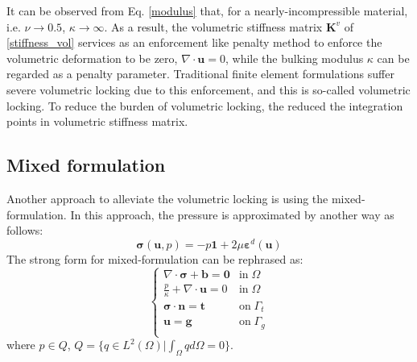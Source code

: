 It can be observed from Eq. \eqref{modulus} that, for a nearly-incompressible material, i.e. $\nu \rightarrow 0.5$, $\kappa \rightarrow \infty$. As a result, the volumetric stiffness matrix $\boldsymbol K^v$ of \eqref{stiffness_vol} services as an enforcement like penalty method to enforce the volumetric deformation to be zero, $\nabla \cdot \boldsymbol u = 0$, while the bulking modulus $\kappa$ can be regarded as a penalty parameter.
Traditional finite element formulations suffer severe volumetric locking due to this enforcement, and this is so-called volumetric locking. 
To reduce the burden of volumetric locking, the reduced the integration points in volumetric stiffness matrix. 

\subsection{Mixed formulation}
Another approach to alleviate the volumetric locking is using the mixed-formulation. In this approach, the pressure is approximated by another way as follows:
\begin{equation}\label{stress_mix}
\boldsymbol \sigma(\boldsymbol u, p) = -p \boldsymbol 1 + 2\mu \boldsymbol \varepsilon^d(\boldsymbol u)
\end{equation}
The strong form for mixed-formulation can be rephrased as:
\begin{equation}\label{strong_mix}
\begin{cases}
    \nabla \cdot \boldsymbol \sigma + \boldsymbol b = \boldsymbol 0 & \mathrm{in} \; \Omega \\
    \frac{p}{\kappa} + \nabla \cdot \boldsymbol u = 0 & \mathrm{in} \; \Omega \\
    \boldsymbol \sigma \cdot \boldsymbol n = \boldsymbol t & \mathrm{on} \; \Gamma_t \\
    \boldsymbol u = \boldsymbol g & \mathrm{on} \; \Gamma_g \\
\end{cases}
\end{equation}
where $p\in Q$, $Q = \{q \in L^2(\Omega) \vert \int_{\Omega} q d\Omega = 0\}$.

